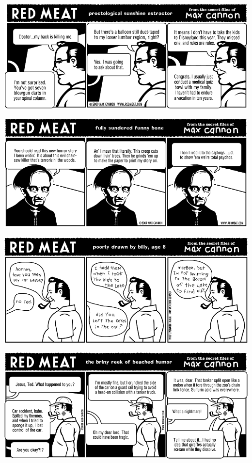 \documentclass[a4paper,twoside,11pt]{article}
\begin{document}
\includegraphics[width=\textwidth]{redmeat_2009-08-25.png}



\includegraphics[width=\textwidth]{redmeat_2009-09-01.png}



\includegraphics[width=\textwidth]{redmeat_2009-09-08.png}



\includegraphics[width=\textwidth]{redmeat_2009-09-15.png}
\end{document}
